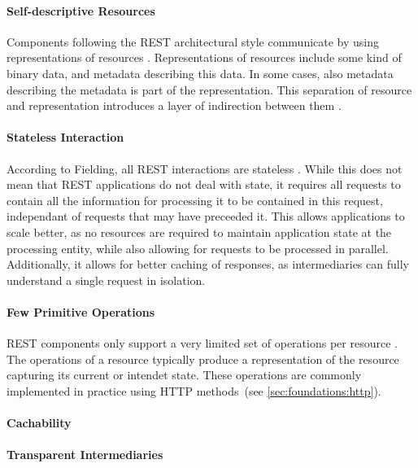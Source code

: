 \paragraph{Self-descriptive Resources}

Components following the \ac{REST} architectural style communicate by using representations of resources \cite{Fielding2000}.
Representations of resources include some kind of binary data, and metadata describing this data.
In some cases, also metadata describing the metadata is part of the representation.
This separation of resource and representation introduces a layer of indirection between them \cite{Erenkrantz2007}.

\paragraph{Stateless Interaction}

According to Fielding, all \ac{REST} interactions are stateless \cite{Fielding2000}.
While this does not mean that \ac{REST} applications do not deal with state, it requires all requests to contain all the information for processing it to be contained in this request, independant of requests that may have preceeded it.
This allows applications to scale better, as no resources are required to maintain application state at the processing entity, while also allowing for requests to be processed in parallel.
Additionally, it allows for better caching of responses, as intermediaries can fully understand a single request in isolation.

\paragraph{Few Primitive Operations}

\ac{REST} components only support a very limited set of operations per resource \cite{Erenkrantz2007}.
The operations of a resource typically produce a representation of the resource capturing its current or intendet state.
These operations are commonly implemented in practice using \ac{HTTP} methods~(see \autoref{sec:foundations:http}).

\paragraph{Cachability}



\paragraph{Transparent Intermediaries}

